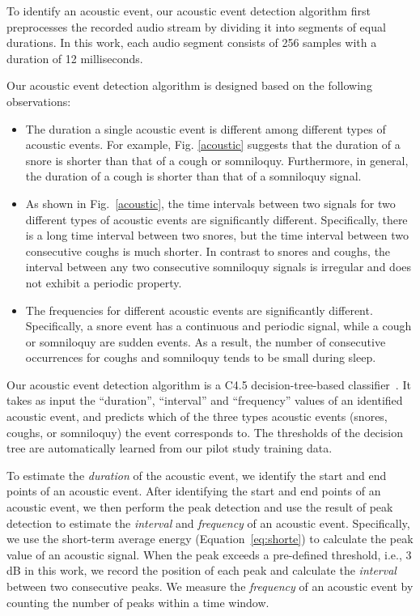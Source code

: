  To identify an acoustic event, our acoustic event detection algorithm first preprocesses the recorded audio
stream by dividing it into segments of equal durations. In this work, each
 audio segment consists of 256 samples with a duration of 12 milliseconds.

 Our acoustic event detection algorithm is designed based on the following observations:

 \begin{itemize}
 \item The duration a single acoustic event is different among different types of acoustic events. For example, Fig. \ref{acoustic}
     suggests that the duration of a snore is shorter than that of a cough or somniloquy. Furthermore, in general, the duration of a
     cough is shorter than that of a somniloquy signal.
 \item As shown in Fig.~\ref{acoustic}, the time intervals between two signals for two different types of acoustic events are
     significantly different. Specifically, there is a long time interval between two snores, but the time interval between two consecutive coughs is much shorter. In contrast to snores and coughs, the interval between any two consecutive somniloquy signals is irregular and does not exhibit a periodic property.
\item The frequencies for different acoustic events are significantly different. Specifically, a snore event has a continuous and periodic signal,
    while a cough or somniloquy are sudden events. As a result, the number of consecutive occurrences for coughs and somniloquy tends to
    be small during sleep.
\end{itemize}


 Our acoustic event detection algorithm is a C4.5 decision-tree-based
classifier~\cite{quinlan2014c4}. It takes as input the ``duration'', ``interval'' and ``frequency'' values of an identified acoustic event,
and predicts which of the three types acoustic events (snores, coughs, or somniloquy) the event corresponds to. The thresholds of the
decision tree are automatically learned from our pilot study training data.

To estimate the \emph{duration} of the acoustic event, we identify the start and end points of an acoustic event. After identifying the
start and end points of an acoustic event, we then perform the peak detection and use the result of peak detection to estimate the
\emph{interval} and \emph{frequency} of an acoustic event. Specifically, we use the short-term average energy (Equation~\ref{eq:shorte}) to
calculate the peak value of an acoustic signal. When the peak exceeds a pre-defined threshold, i.e., 3 dB in this work, we record the
position of each peak and calculate the \emph{interval} between two consecutive peaks. We measure the \emph{frequency} of an acoustic event
by counting the number of peaks within a time window.


